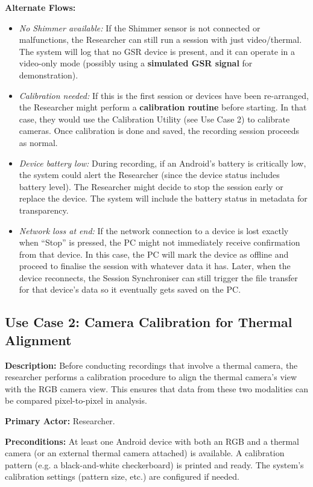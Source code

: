 \textbf{Alternate Flows:}
\begin{itemize}
  \item \emph{No Shimmer available:} If the Shimmer sensor is not connected or malfunctions, the Researcher can still run a session with just video/thermal. The system will log that no GSR device is present, and it can operate in a video-only mode (possibly using a \textbf{simulated GSR signal} for demonstration).
  \item \emph{Calibration needed:} If this is the first session or devices have been re-arranged, the Researcher might perform a \textbf{calibration routine} before starting. In that case, they would use the Calibration Utility (see Use Case 2) to calibrate cameras. Once calibration is done and saved, the recording session proceeds as normal.
  \item \emph{Device battery low:} During recording, if an Android's battery is critically low, the system could alert the Researcher (since the device status includes battery level). The Researcher might decide to stop the session early or replace the device. The system will include the battery status in metadata for transparency.
  \item \emph{Network loss at end:} If the network connection to a device is lost exactly when ``Stop'' is pressed, the PC might not immediately receive confirmation from that device. In this case, the PC will mark the device as offline and proceed to finalise the session with whatever data it has. Later, when the device reconnects, the Session Synchroniser can still trigger the file transfer for that device's data so it eventually gets saved on the PC.
\end{itemize}

\subsection{Use Case 2: Camera Calibration for Thermal Alignment}
\textbf{Description:} Before conducting recordings that involve a thermal camera, the researcher performs a calibration procedure to align the thermal camera's view with the RGB camera view. This ensures that data from these two modalities can be compared pixel-to-pixel in analysis.

\textbf{Primary Actor:} Researcher.

\textbf{Preconditions:} At least one Android device with both an RGB and a thermal camera (or an external thermal camera attached) is available. A calibration pattern (e.g. a black-and-white checkerboard) is printed and ready. The system's calibration settings (pattern size, etc.) are configured if needed.

